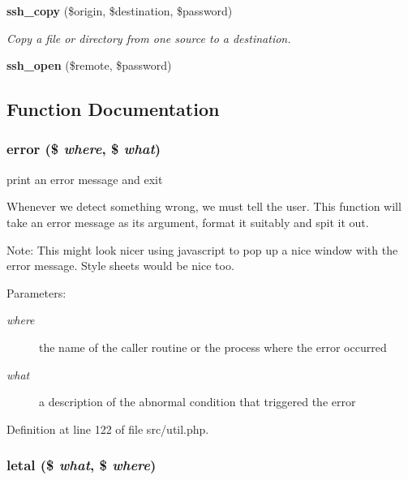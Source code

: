 \begin{CompactItemize}
{\bf ssh\_\-copy} (\$origin, \$destination, \$password)
\begin{CompactList}\small\item\em Copy a file or directory from one source to a destination. \item\end{CompactList}\item 
{\bf ssh\_\-open} (\$remote, \$password)
\end{CompactItemize}


\subsection{Function Documentation}
\subsubsection{\setlength{\rightskip}{0pt plus 5cm}error (\$ {\em where}, \$ {\em what})}\label{src_2util_8php_a3}


print an error message and exit 

Whenever we detect something wrong, we must tell the user. This function will take an error message as its argument, format it suitably and spit it out.

\begin{Desc}
\item[Note:]This might look nicer using javascript to pop up a nice window with the error message. Style sheets would be nice too.\end{Desc}
\begin{Desc}
\item[Parameters:]
\begin{description}
\item[{\em where}]the name of the caller routine or the process where the error occurred \item[{\em what}]a description of the abnormal condition that triggered the error \end{description}
\end{Desc}


Definition at line 122 of file src/util.php.
\subsubsection{\setlength{\rightskip}{0pt plus 5cm}letal (\$ {\em what}, \$ {\em where})}\label{src_2util_8php_a4}



